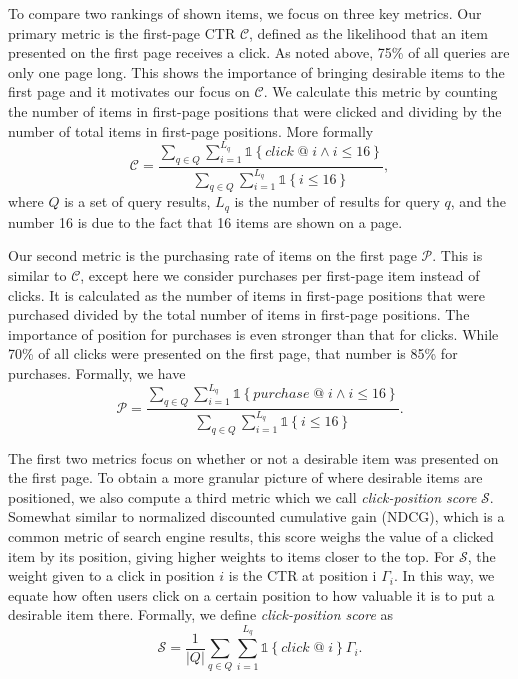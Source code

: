 \documentclass{article}
\begin{document}
To compare two rankings of shown items, we focus on three key metrics. Our primary 
metric is the first-page CTR $\mathscr{C}$, defined as the likelihood that an item 
presented on the first page receives a click. As noted above, 75\% of all queries 
are only one page long. This shows the importance of bringing desirable items to the 
first page and it motivates our focus on $\mathscr{C}$. We calculate this metric by 
counting the number of items in first-page positions that were clicked and dividing 
by the number of total items in first-page positions. More formally
\begin{equation}
    \mathscr{C} = \frac{\sum_{q \in Q}\sum_{i=1}^{L_q}\mathds{1}\left\{click\; @\; i \wedge i \leq 16\right\}}{\sum_{q \in Q}\sum_{i=1}^{L_q}\mathds{1}\left\{i \leq 16\right\}},
\end{equation}
where $Q$ is a set of query results, $L_q$ is the number of results for query $q$, and
the number 16 is due to the fact that 16 items are shown on a page.

Our second metric is the purchasing rate of items on the first page $\mathscr{P}$. This is 
similar to $\mathscr{C}$, except here we consider purchases per first-page item 
instead of clicks. It is calculated as the number of items in first-page positions that 
were purchased divided by the total number of items in first-page positions. The 
importance of position for purchases is even stronger than that for clicks. While 70\% of 
all clicks were presented on the first page, that number is 85\% for purchases. Formally,
we have
\begin{equation}
    \mathscr{P} = \frac{\sum_{q \in Q}\sum_{i=1}^{L_q}\mathds{1}\left\{purchase\; @\; i \wedge i \leq 16\right\}}{\sum_{q \in Q}\sum_{i=1}^{L_q}\mathds{1}\left\{i \leq 16\right\}}.
\end{equation}

The first two metrics focus on whether or not a desirable item was presented on the 
first page. To obtain a more granular picture of where desirable items are positioned, 
we also compute a third metric which we call {\em click-position score} $\mathscr{S}$. 
Somewhat similar to normalized discounted cumulative gain (NDCG), which is a common metric
of search engine results, this score weighs the value of a clicked item by its position, 
giving higher weights to items closer to the top. For $\mathscr{S}$, the weight given to 
a click in position $i$ is the CTR at position i $\Gamma_i$. In this way, we equate how 
often users click on a certain position to how valuable it is to put a desirable 
item there. Formally, we define {\em click-position score} as
\begin{equation}
    \mathscr{S} = \frac{1}{\left\vert{Q}\right\vert}\sum_{q \in Q}\sum_{i=1}^{L_q}\mathds{1}\left\{click\; @\; i\right\}\Gamma_i.
\end{equation}
\end{document}
